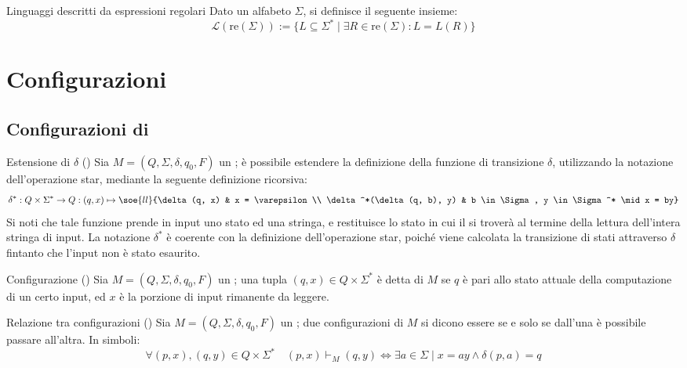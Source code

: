 \documentclass[a4paper, 12pt]{report}
\begin{document}
    \begin{frameddefn}{Linguaggi descritti da espressioni regolari}
        Dato un alfabeto $\Sigma$, si definisce  il seguente insieme: $$\mathcal{L}(\mathrm{re}(\Sigma)) := \{L \subseteq \Sigma ^* \mid \exists R \in \mathrm{re}(\Sigma) : L= L(R)\}$$
    \end{frameddefn}

    \section{Configurazioni}

    \subsection{Configurazioni di \DFA}

    \begin{frameddefn}[label={extended trans}]{Estensione di $\delta$ (\DFA)}
        Sia $M = (Q, \Sigma, \delta, q_0, F)$ un \DFA; è possibile estendere la definizione della funzione di transizione $\delta$, utilizzando la notazione dell'operazione star, mediante la seguente definizione ricorsiva: $$\delta^*: Q \times \Sigma ^* \to Q : (q, x) \mapsto \soe{ll}{\delta(q, x) & x = \varepsilon \\ \delta^*(\delta(q, b), y) & b \in \Sigma, y \in \Sigma^* \mid x = by}$$ Si noti che tale funzione prende in input uno stato ed una stringa, e restituisce lo stato in cui il \DFA si troverà al termine della lettura dell'intera stringa di input. La notazione $\delta^*$ è coerente con la definizione dell'operazione star, poiché viene calcolata la transizione di stati attraverso $\delta$ fintanto che l'input non è stato esaurito.
    \end{frameddefn}

    \begin{frameddefn}{Configurazione (\DFA)}
        Sia $M = (Q, \Sigma, \delta, q_0, F)$ un \DFA; una tupla $(q, x) \in Q \times \Sigma^*$ è detta  di $M$ se $q$ è pari allo stato attuale della computazione di un certo input, ed $x$ è la porzione di input rimanente da leggere.
    \end{frameddefn}

    \begin{frameddefn}[label={rel config}]{Relazione tra configurazioni (\DFA)}
        Sia $M = (Q, \Sigma, \delta, q_0, F)$ un \DFA; due configurazioni di $M$ si dicono essere  se e solo se dall'una è possibile passare all'altra. In simboli: $$\forall (p, x), (q, y) \in Q \times \Sigma^* \quad (p, x) \vdash_M (q, y) \iff \exists a \in \Sigma \mid x = ay \land \delta(p, a) = q$$
    \end{frameddefn}
\end{document}

